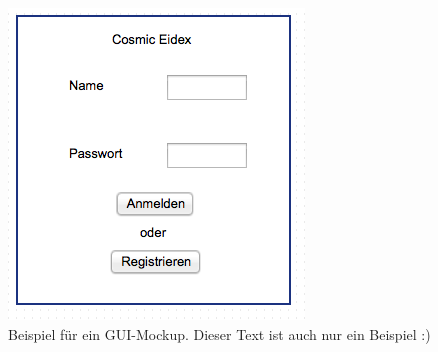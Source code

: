 \begin{figure}
	\centering
	\includegraphics{img/gui-einloggen}
	\caption{Beispiel für ein GUI-Mockup. Dieser Text ist auch nur ein Beispiel :)}
	\label{gui:login}
\end{figure}